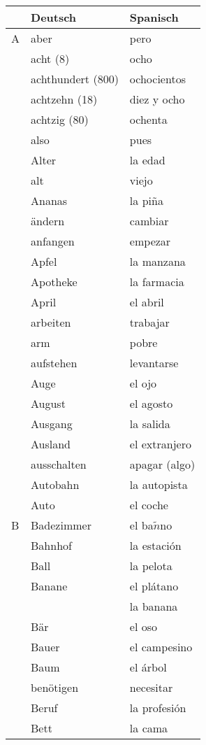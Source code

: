 \documentclass[10pt,spanish]{article}
\begin{document}
\begin{longtable}{p{} p{} | p{}} 
~ & \textbf{Deutsch}     & \textbf{Spanisch}                                       \\ \hline
\hline
\endhead %
A & aber & pero  \\
& acht (8) & ocho  \\
& achthundert (800) & ochocientos \\
& achtzehn (18) & diez y ocho  \\
& achtzig (80) & ochenta  \\
& also & pues  \\
& Alter & la edad  \\
& alt & viejo  \\
& Ananas & la pi\~{n}a  \\
& ändern & cambiar \\
& anfangen & empezar  \\
& Apfel & la manzana \\
& Apotheke & la farmacia  \\
& April & el abril   \\
& arbeiten & trabajar  \\
& arm & pobre \\
& aufstehen & levantarse \\
& Auge & el ojo  \\
& August & el agosto  \\
& Ausgang & la salida  \\
& Ausland & el extranjero \\
& ausschalten & apagar (algo)  \\
& Autobahn & la autopista \\
& Auto & el coche  \\
B & Badezimmer & el ba$\tilde{n}$no  \\
& Bahnhof & la estación \\
& Ball & la pelota  \\
& Banane & el plátano  \\
& & la banana \\ 
& Bär & el oso \\
& Bauer & el campesino  \\
& Baum & el árbol \\
& benötigen & necesitar  \\
& Beruf & la profesión  \\
& Bett & la cama  \\

\end{longtable}
\end{document}
